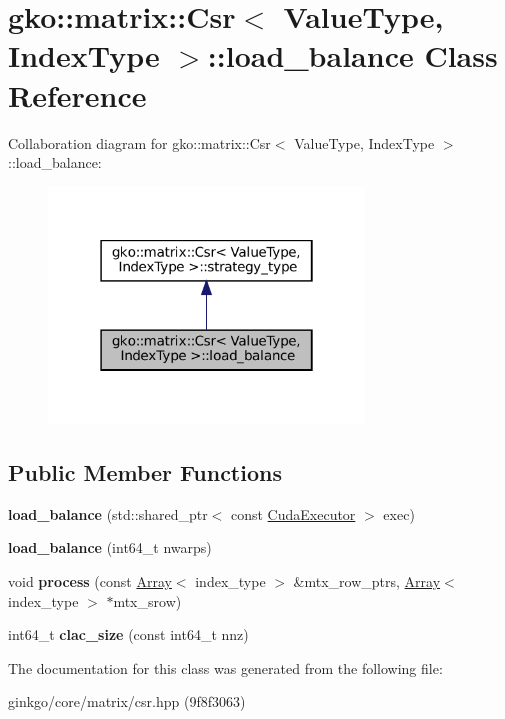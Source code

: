\hypertarget{classgko_1_1matrix_1_1Csr_1_1load__balance}{}\section{gko\+:\+:matrix\+:\+:Csr$<$ Value\+Type, Index\+Type $>$\+:\+:load\+\_\+balance Class Reference}
\label{classgko_1_1matrix_1_1Csr_1_1load__balance}


Collaboration diagram for gko\+:\+:matrix\+:\+:Csr$<$ Value\+Type, Index\+Type $>$\+:\+:load\+\_\+balance\+:
\nopagebreak
\begin{figure}[H]
\begin{center}
\leavevmode
\includegraphics[width=238pt]{classgko_1_1matrix_1_1Csr_1_1load__balance__coll__graph}
\end{center}
\end{figure}
\subsection*{Public Member Functions}
\begin{DoxyCompactItemize}
\item 
\mbox{\label{classgko_1_1matrix_1_1Csr_1_1load__balance_ad80a0ef5dd9bb2e4f311e59e5e4e013e}} 
{\bfseries load\+\_\+balance} (std\+::shared\+\_\+ptr$<$ const \hyperlink{classgko_1_1CudaExecutor}{Cuda\+Executor} $>$ exec)
\item 
\mbox{\label{classgko_1_1matrix_1_1Csr_1_1load__balance_a851a72f0ac2f8be45982b5aa0b85d15d}} 
{\bfseries load\+\_\+balance} (int64\+\_\+t nwarps)
\item 
\mbox{\label{classgko_1_1matrix_1_1Csr_1_1load__balance_a8219420a14f2d6fc2242897900ce4448}} 
void {\bfseries process} (const \hyperlink{classgko_1_1Array}{Array}$<$ index\+\_\+type $>$ \&mtx\+\_\+row\+\_\+ptrs, \hyperlink{classgko_1_1Array}{Array}$<$ index\+\_\+type $>$ $\ast$mtx\+\_\+srow)
\item 
\mbox{\label{classgko_1_1matrix_1_1Csr_1_1load__balance_aafc499605813d57af41c57744d44e133}} 
int64\+\_\+t {\bfseries clac\+\_\+size} (const int64\+\_\+t nnz)
\end{DoxyCompactItemize}


The documentation for this class was generated from the following file\+:\begin{DoxyCompactItemize}
\item 
ginkgo/core/matrix/csr.\+hpp (9f8f3063)\end{DoxyCompactItemize}
